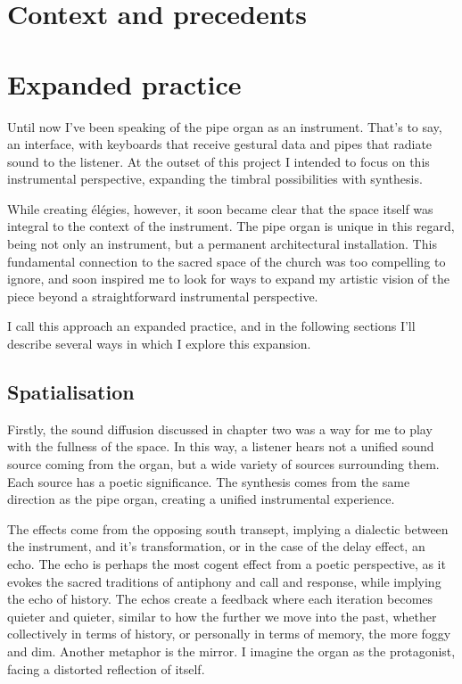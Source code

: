 \documentclass[12pt,twoside,maitrise]{dms_ks}
\theoremstyle{definition}
\begin{document}
\section{Context and precedents}

\section{Expanded practice}

Until now I've been speaking of the pipe organ as an instrument. That's to say, an interface, with keyboards that receive gestural data and pipes that radiate sound to the listener. At the outset of this project I intended to focus on this instrumental perspective, expanding the timbral possibilities with synthesis.

While creating élégies, however, it soon became clear that the space itself was integral to the context of the instrument. The pipe organ is unique in this regard, being not only an instrument, but a permanent architectural installation. This fundamental connection to the sacred space of the church was too compelling to ignore, and soon inspired me to look for ways to expand my artistic vision of the piece beyond a straightforward instrumental perspective.

I call this approach an expanded practice, and in the following sections I'll describe several ways in which I explore this expansion.

\subsection{Spatialisation}

Firstly, the sound diffusion discussed in chapter two was a way for me to play with the fullness of the space. In this way, a listener hears not a unified sound source coming from the organ, but a wide variety of sources surrounding them. Each source has a poetic significance. The synthesis comes from the same direction as the pipe organ, creating a unified instrumental experience.

The effects come from the opposing south transept, implying a dialectic between the instrument, and it's transformation, or in the case of the delay effect, an echo. The echo is perhaps the most cogent effect from a poetic perspective, as it evokes the sacred traditions of antiphony and call and response, while implying the echo of history. The echos create a feedback where each iteration becomes quieter and quieter, similar to how the further we move into the past, whether collectively in terms of history, or personally in terms of memory, the more foggy and dim. Another metaphor is the mirror. I imagine the organ as the protagonist, facing a distorted reflection of itself.
\end{document}
